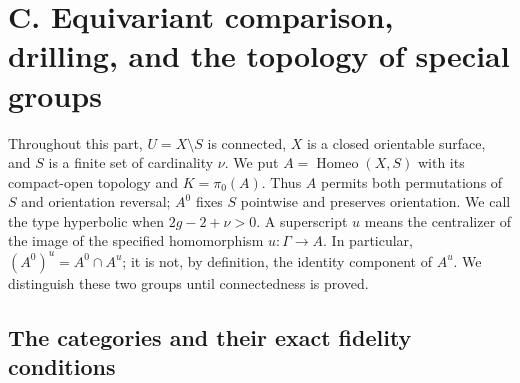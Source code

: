 \section{C. Equivariant comparison, drilling, and the topology of special groups}
\label{sec:part-c}

Throughout this part, $U=X\setminus S$ is connected, $X$ is a closed
orientable surface, and $S$ is a finite set of cardinality $\nu$. We put
$A=\operatorname{Homeo}(X,S)$ with its compact-open topology and
$K=\pi_0(A)$. Thus $A$ permits both permutations of $S$ and orientation
reversal; $A^0$ fixes $S$ pointwise and preserves orientation. We call the
type hyperbolic when $2g-2+\nu>0$. A superscript $u$ means the centralizer
of the image of the specified homomorphism $u:\Gamma\to A$. In particular,
$(A^0)^u=A^0\cap A^u$; it is not, by definition, the identity component
of $A^u$. We distinguish these two groups until connectedness is proved.

\subsection{The categories and their exact fidelity conditions}


